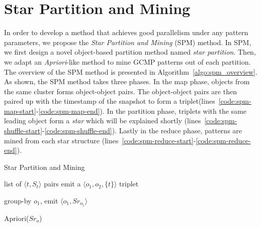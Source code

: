 \section{Star Partition and Mining}
\label{sec:spm_solution}
In order to develop a method that achieves good parallelism 
under any pattern parameters, we propose 
the \emph{Star Partition and Mining} (SPM) method. In SPM,
we first design a novel object-based partition method named \emph{star partition}. 
Then, we adapt an \emph{Apriori}-like 
method to mine GCMP patterns out of each partition.
The overview of the SPM method is presented in Algorithm~\ref{algo:spm_overview}.
As shown, the SPM method takes three phases. 
In the map phase, objects from the same cluster forms object-object pairs. 
The object-object pairs are then paired up with the timestamp of 
the snapshot to form a triplet(lines~\ref{code:spm-map-start}-\ref{code:spm-map-end}). 
In the partition phase, triplets with the same leading object form a \emph{star} which will be explained shortly 
(lines~\ref{code:spm-shuffle-start}-\ref{code:spm-shuffle-end}).
Lastly in the reduce phase, patterns are mined from each star structure (lines~\ref{code:spm-reduce-start}-\ref{code:spm-reduce-end}).

\begin{algorithm}
\caption{Star Partition and Mining}
\label{algo:spm_overview}
\begin{algorithmic}[1]
\Require list of $\langle t, S_t \rangle$ pairs
\label{code:spm-map-start}
		  \label{code:spm-edge-direct}
			\State emit a $\langle o_1, o_2, \{t\}\rangle$ triplet
		\EndIf
	\EndFor
\EndFor
\label{code:spm-map-end}

\label{code:spm-shuffle-start}
	\State group-by $o_1$, emit $\langle o_1, Sr_{o_1} \rangle$ 
\EndFor
\label{code:spm-shuffle-end}

\label{code:spm-reduce-start}
\State Apriori($Sr_o$)
\EndFor
\label{code:spm-reduce-end}

\end{algorithmic}
\end{algorithm}

